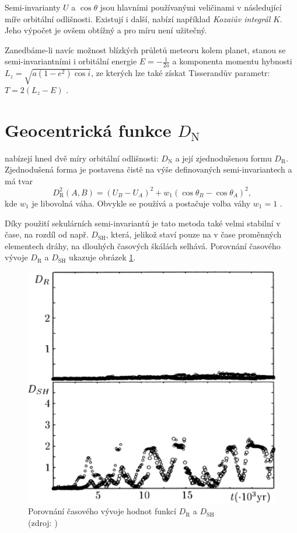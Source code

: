 \medskip

Semi-invarianty $U$ a $\cos{\theta}$ jsou hlavními používanými veličinami v následující míře orbitální odlišnosti. Existují i další, \cite{newapproach} nabízí například \textit{Kozaiův integrál} $K$. Jeho výpočet je ovšem obtížný a pro míru není užitečný.

Zanedbáme-li navíc možnost blízkých průletů meteoru kolem planet, stanou se semi-invariantními i orbitální energie $E=-\frac{1}{2a}$ a komponenta momentu hybnosti $L_z=\sqrt{a(1-e^2)\cos{i}}$, ze kterých lze také získat Tisserandův parametr: $T=2(L_z-E)$ \cite{newapproach}.

\section{Geocentrická funkce $D_\text{N}$}%
\citeauthor{newapproach} nabízejí hned dvě míry orbitální odlišnosti: $D_\text{N}$ a její zjednodušenou formu $D_\text{R}$. Zjednodušená forma je postavena čistě na výše definovaných semi-invariantech a má tvar \cite{newapproach}
\begin{equation}
    D_\text{R}^2(A,B)=\left( U_B-U_A \right)^2+w_1\left( \cos{\theta_B} - \cos{\theta_A} \right)^2\text{,}
\end{equation}
kde $w_1$ je libovolná váha. Obvykle se používá a postačuje volba váhy $w_1=1$ \cite{newapproach}\cite{galligan}.

Díky použití sekulárních semi-invariantů je tato metoda také velmi stabilní v čase, na rozdíl od např. $D_\text{SH}$, která, jelikož staví pouze na v čase proměnných elementech dráhy, na dlouhých časových škálách selhává. Porovnání časového vývoje $D_\text{R}$ a $D_\text{SH}$ ukazuje obrázek \ref{img:new:time}.

\begin{figure}[ht]
    \centering
    \includegraphics[width=0.5\linewidth]{img/plots/newapproach-time-evolution.png}
    \caption[Porovnání časového vývoje hodnot funkcí $D_\text{R}$ a $D_\text{SH}$]{
        Porovnání časového vývoje hodnot funkcí $D_\text{R}$ a $D_\text{SH}$\\
        {\small (zdroj: \cite{newapproach})}
    }
    \label{img:new:time}
\end{figure}

